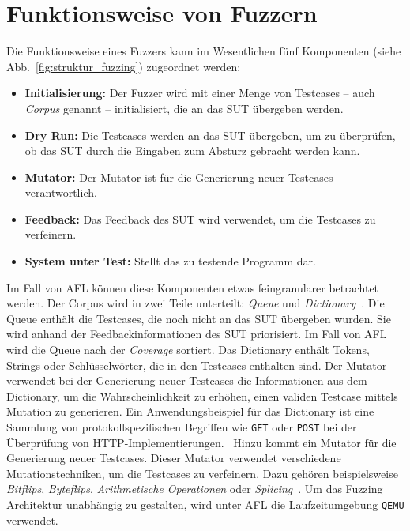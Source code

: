 \section{Funktionsweise von Fuzzern}\label{sec:funktionsweise}
Die Funktionsweise eines Fuzzers kann im Wesentlichen fünf Komponenten (siehe Abb.~\ref{fig:struktur_fuzzing}) zugeordnet werden:
\begin{itemize}
    \item \textbf{Initialisierung:} Der Fuzzer wird mit einer Menge von Testcases -- auch \textit{Corpus} genannt -- initialisiert, die an das SUT übergeben werden.
    \item \textbf{Dry Run:} Die Testcases werden an das SUT übergeben, um zu überprüfen, ob das SUT durch die Eingaben zum
        Absturz gebracht werden kann.
    \item \textbf{Mutator:} Der Mutator ist für die Generierung neuer Testcases verantwortlich.
    \item \textbf{Feedback:} Das Feedback des SUT wird verwendet, um die Testcases zu verfeinern.
    \item \textbf{System unter Test:} Stellt das zu testende Programm dar.
\end{itemize}
Im Fall von AFL können diese Komponenten etwas feingranularer betrachtet werden.
Der Corpus wird in zwei Teile unterteilt: \textit{Queue} und \textit{Dictionary}~\cite{afl_whitepaper}.
Die Queue enthält die Testcases, die noch nicht an das SUT übergeben wurden.
Sie wird anhand der Feedbackinformationen des SUT priorisiert.
Im Fall von AFL wird die Queue nach der \textit{Coverage} sortiert.
Das Dictionary enthält Tokens, Strings oder Schlüsselwörter, die in den Testcases enthalten sind.
Der Mutator verwendet bei der Generierung neuer Testcases die Informationen aus dem Dictionary, um die Wahrscheinlichkeit
zu erhöhen, einen validen Testcase mittels Mutation zu generieren.
Ein Anwendungsbeispiel für das Dictionary ist eine Sammlung von protokollspezifischen Begriffen wie \texttt{GET} oder
\texttt{POST} bei der Überprüfung von HTTP-Implementierungen.~\newline
Hinzu kommt ein Mutator für die Generierung neuer Testcases.
Dieser Mutator verwendet verschiedene Mutationstechniken, um die Testcases zu verfeinern.
Dazu gehören beispielsweise \textit{Bitflips}, \textit{Byteflips}, \textit{Arithmetische Operationen} oder
\textit{Splicing}~\cite{afl_whitepaper}.\newline
Um das Fuzzing Architektur unabhängig zu gestalten, wird unter AFL die Laufzeitumgebung \texttt{QEMU} verwendet.
